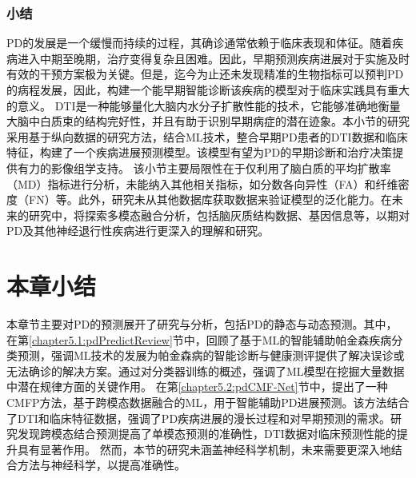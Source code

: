 \subsubsection{小结}
PD的发展是一个缓慢而持续的过程，其确诊通常依赖于临床表现和体征。随着疾病进入中期至晚期，治疗变得复杂且困难。因此，早期预测疾病进展对于实施及时有效的干预方案极为关键。但是，迄今为止还未发现精准的生物指标可以预判PD的病程发展，因此，构建一个能早期智能诊断该疾病的模型对于临床实践具有重大的意义。
DTI是一种能够量化大脑内水分子扩散性能的技术，它能够准确地衡量大脑中白质束的结构完好性，并且有助于识别早期病症的潜在迹象。本小节的研究采用基于纵向数据的研究方法，结合ML技术，整合早期PD患者的DTI数据和临床特征，构建了一个疾病进展预测模型。该模型有望为PD的早期诊断和治疗决策提供有力的影像组学支持。
该小节主要局限性在于仅利用了脑白质的平均扩散率（MD）指标进行分析，未能纳入其他相关指标，如分数各向异性（FA）和纤维密度（FN）等。此外，研究未从其他数据库获取数据来验证模型的泛化能力。在未来的研究中，将探索多模态融合分析，包括脑灰质结构数据、基因信息等，以期对PD及其他神经退行性疾病进行更深入的理解和研究。




\section{本章小结}
本章节主要对PD的预测展开了研究与分析，包括PD的静态与动态预测。其中，
在第\ref{chapter5.1:pdPredictReview}节中，回顾了基于ML的智能辅助帕金森疾病分类预测，强调ML技术的发展为帕金森病的智能诊断与健康测评提供了解决误诊或无法确诊的解决方案。通过对分类器训练的概述，强调了ML模型在挖掘大量数据中潜在规律方面的关键作用。
在第\ref{chapter5.2:pdCMF-Net}节中，提出了一种CMFP方法，基于跨模态数据融合的ML，用于智能辅助PD进展预测。该方法结合了DTI和临床特征数据，强调了PD疾病进展的漫长过程和对早期预测的需求。研究发现跨模态结合预测提高了单模态预测的准确性，DTI数据对临床预测性能的提升具有显著作用。
然而，本节的研究未涵盖神经科学机制，未来需要更深入地结合方法与神经科学，以提高准确性。
